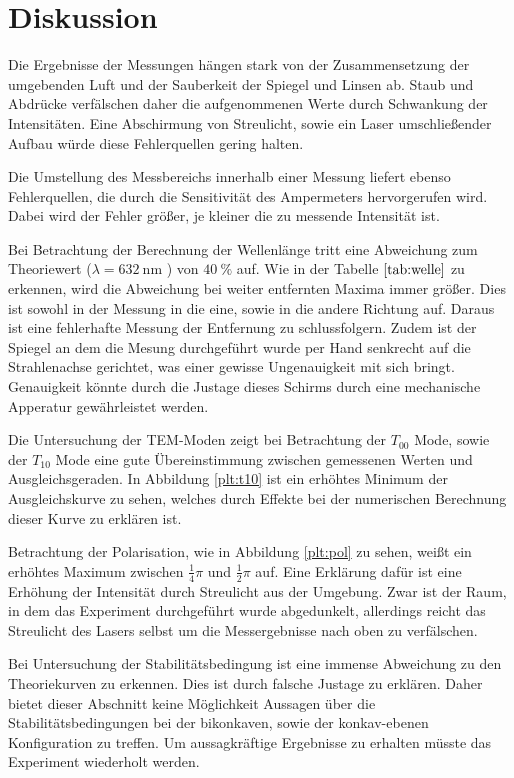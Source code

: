 \newpage
\section{Diskussion}
Die Ergebnisse der Messungen hängen stark von der Zusammensetzung der umgebenden
Luft und der Sauberkeit der Spiegel und Linsen ab. Staub und Abdrücke verfälschen
daher die aufgenommenen Werte durch Schwankung der Intensitäten. Eine
Abschirmung von Streulicht, sowie ein Laser umschließender Aufbau würde diese
Fehlerquellen gering halten.

Die Umstellung des Messbereichs innerhalb einer Messung liefert ebenso
Fehlerquellen, die durch die Sensitivität des Ampermeters hervorgerufen wird.
Dabei wird der Fehler größer, je kleiner die zu messende Intensität ist.

Bei Betrachtung der Berechnung der Wellenlänge tritt eine Abweichung zum
Theoriewert ($\lambda = \SI{632}{\nano\meter}$ \cite{anleitung}) von
$\SI{40}{\percent}$ auf. Wie in der Tabelle $\ref{tab:welle}$ zu erkennen,
wird die Abweichung bei weiter entfernten Maxima immer größer. Dies ist sowohl
in der Messung in die eine, sowie in die andere Richtung auf. Daraus ist eine
fehlerhafte Messung der Entfernung zu schlussfolgern. Zudem ist der Spiegel an
dem die Mesung durchgeführt wurde per Hand senkrecht auf die Strahlenachse
gerichtet, was einer gewisse Ungenauigkeit mit sich bringt. Genauigkeit könnte
durch die Justage dieses Schirms durch eine mechanische Apperatur gewährleistet
werden.

Die Untersuchung der TEM-Moden zeigt bei Betrachtung der $T_{00}$ Mode, sowie
der $T_{10}$ Mode eine gute Übereinstimmung zwischen gemessenen Werten und
Ausgleichsgeraden. In Abbildung \ref{plt:t10} ist ein erhöhtes Minimum der
Ausgleichskurve zu sehen, welches durch Effekte bei der numerischen Berechnung
dieser Kurve zu erklären ist.

Betrachtung der Polarisation, wie in Abbildung \ref{plt:pol} zu sehen, weißt
ein erhöhtes Maximum zwischen $\frac{1}{4}\pi$ und $\frac{1}{2}\pi$ auf. Eine
Erklärung dafür ist eine Erhöhung der Intensität durch Streulicht aus der
Umgebung. Zwar ist der Raum, in dem das Experiment durchgeführt wurde
abgedunkelt, allerdings reicht das Streulicht des Lasers selbst um die
Messergebnisse nach oben zu verfälschen.

Bei Untersuchung der Stabilitätsbedingung ist eine immense 
Abweichung zu den Theoriekurven zu erkennen. Dies ist durch falsche Justage zu
erklären. Daher bietet dieser Abschnitt keine Möglichkeit Aussagen über die
Stabilitätsbedingungen bei der bikonkaven, sowie der konkav-ebenen Konfiguration
zu treffen. Um aussagkräftige Ergebnisse zu erhalten müsste das Experiment
wiederholt werden.
